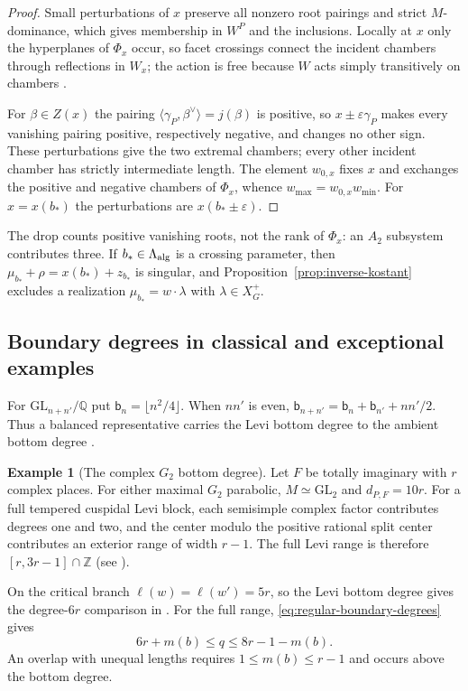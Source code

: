 \documentclass[12pt]{amsart}
\numberwithin{equation}{section}
\theoremstyle{plain}
\theoremstyle{definition}
\newtheorem{example}[theorem]{Example}
\theoremstyle{remark}
\newcommand{\Q}{\mathbb Q}
\newcommand{\GL}{\mathrm{GL}}
\newcommand{\Z}{\mathbb{Z}}
\begin{document}
\begin{proof}
Small perturbations of $x$ preserve all nonzero root pairings and strict $M$-dominance, which gives membership in $W^P$ and the inclusions. Locally at $x$ only the hyperplanes of $\Phi_x$ occur, so facet crossings connect the incident chambers through reflections in $W_x$; the action is free because $W$ acts simply transitively on chambers \cite[\S\S1.8, 1.12]{Humphreys1990}.

For $\beta\in Z(x)$ the pairing $\langle\gamma_P,\beta^\vee\rangle=j(\beta)$ is positive, so $x\pm\varepsilon\gamma_P$ makes every vanishing pairing positive, respectively negative, and changes no other sign. These perturbations give the two extremal chambers; every other incident chamber has strictly intermediate length. The element $w_{0,x}$ fixes $x$ and exchanges the positive and negative chambers of $\Phi_x$, whence $w_{\max}=w_{0,x}w_{\min}$. For $x=x(b_*)$ the
perturbations are $x(b_*\pm\varepsilon)$.
\end{proof}

The drop counts positive vanishing roots, not the rank of $\Phi_x$: an $A_2$ subsystem contributes three. If $b_*\in\Lambda_{\rm alg}$ is a crossing parameter, then $\mu_{b_*}+\rho=x(b_*)+z_{b_*}$ is singular, and Proposition~\ref{prop:inverse-kostant} excludes a
realization $\mu_{b_*}=w\cdot\lambda$ with $\lambda\in X_G^+$.

\subsection{Boundary degrees in classical and exceptional examples}
For $\GL_{n+n'}/\Q$ put $\mathsf b_n=\lfloor n^2/4\rfloor$. When $nn'$ is even, $\mathsf b_{n+n'}=\mathsf b_n+\mathsf b_{n'}+nn'/2$. Thus a balanced representative carries the Levi bottom degree to the ambient bottom degree \cite[Ch.~3]{HarderRaghuram2020}.

\begin{example}[The complex $G_2$ bottom degree]
Let $F$ be totally imaginary with $r$ complex places. For either maximal $G_2$ parabolic, $M\simeq\GL_2$ and $d_{P,F}=10r$. For a full tempered cuspidal Levi block, each semisimple complex factor contributes degrees one and two, and the center modulo the positive rational split center contributes an exterior range of width $r-1$. The full Levi range is therefore $[r,3r-1]\cap\Z$ (see \cite[Prop.~2.15]{Raghuram2025}).

On the critical branch $\ell(w)=\ell(w')=5r$, so the Levi bottom degree gives the degree-$6r$ comparison in \cite{HosseiniJafariG2}. For the full range, \eqref{eq:regular-boundary-degrees} gives 
\[
 6r+m(b)\le q\le8r-1-m(b).
\]
An overlap with unequal lengths requires $1\le m(b)\le r-1$ and occurs above the bottom degree.
\end{example}
\end{document}
